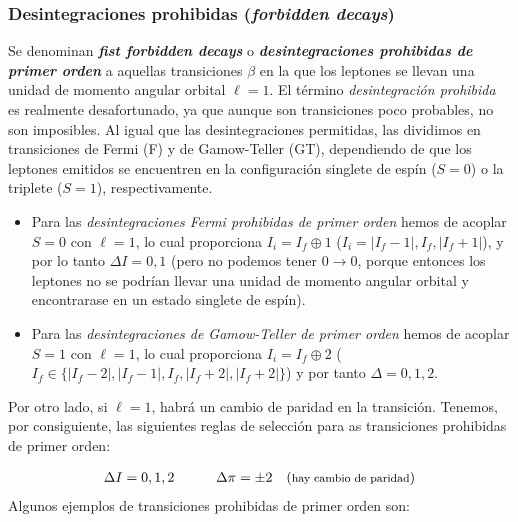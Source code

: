 \subsubsection{Desintegraciones prohibidas (\textit{forbidden decays})}

Se denominan \textit{\textbf{fist forbidden decays}} o \textit{\textbf{desintegraciones prohibidas de primer orden}} a aquellas transiciones $\beta$ en la que los leptones se llevan una unidad de momento angular orbital $\ell=1$. El término \textit{desintegración prohibida} es realmente desafortunado, ya que aunque son transiciones poco probables, no son imposibles. Al igual que las desintegraciones permitidas, las dividimos en transiciones de Fermi (F) y de Gamow-Teller (GT), dependiendo de que los leptones emitidos se encuentren en la configuración singlete de espín ($S=0$) o la triplete ($S=1$), respectivamente.



\begin{itemize}
	\item Para las \textit{desintegraciones Fermi prohibidas de primer orden} hemos de acoplar $S=0$ con $\ell=1$, lo cual proporciona $I_i = I_f\oplus 1$ ($I_i=|I_f-1|,I_f,|I_f+1|$), y por lo tanto $\Delta I = 0,1$ (pero no podemos tener $0\rightarrow 0$, porque entonces los leptones no se podrían llevar una unidad de momento angular orbital y encontrarase en un estado singlete de espín).
	
	\item Para las \textit{desintegraciones de Gamow-Teller de primer orden} hemos de acoplar $S=1$ con $\ell=1$, lo cual proporciona $I_i=I_f\oplus 2$ ($I_f\in \{ |I_f-2|,|I_f-1|,I_f,|I_f+2|,|I_f+2| \}$) y por tanto $\Delta =0,1,2$. 
\end{itemize}

Por otro lado, si $\ell=1$, habrá un cambio de paridad en la transición. Tenemos, por consiguiente, las siguientes reglas de selección para as transiciones prohibidas de primer orden:

\begin{eqnarray}
	\Delta I = 0,1,2 \quad \quad \quad \Delta \pi = \pm 2 \quad (\text{{\footnotesize  hay cambio de paridad}})
\end{eqnarray}
Algunos ejemplos de transiciones prohibidas de primer orden son:

